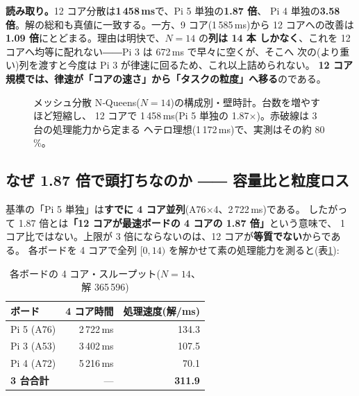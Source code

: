 \noindent
\textbf{読み取り。}12 コア分散は\textbf{1\,458\,ms}で、Pi 5 単独の\textbf{1.87 倍}、
Pi 4 単独の\textbf{3.58 倍}。解の総和も真値に一致する。一方、9 コア(1\,585\,ms)から
12 コアへの改善は\textbf{1.09 倍}にとどまる。理由は明快で、$N{=}14$ の\textbf{列は 14 本
しかなく}、これを 12 コアへ均等に配れない――Pi 3 は 672\,ms で早々に空くが、そこへ
次の(より重い)列を渡すと今度は Pi 3 が律速に回るため、これ以上詰められない。
\textbf{12 コア規模では、律速が「コアの速さ」から「タスクの粒度」へ移る}のである。

\begin{figure}[h]\centering
{}
\caption{メッシュ分散 N‑Queens($N{=}14$)の構成別・壁時計。台数を増やすほど短縮し、
12 コアで 1\,458\,ms(Pi 5 単独の 1.87$\times$)。赤破線は 3 台の処理能力から定まる
ヘテロ理想(1\,172\,ms)で、実測はその約 80\,\%。}\label{fig:scale}
\end{figure}

\subsection{なぜ 1.87 倍で頭打ちなのか ―― 容量比と粒度ロス}
基準の「Pi 5 単独」は\textbf{すでに 4 コア並列}(A76$\times$4、2\,722\,ms)である。
したがって 1.87 倍とは\textbf{「12 コアが最速ボードの 4 コアの 1.87 倍」}という意味で、
1 コア比ではない。上限が 3 倍にならないのは、12 コアが\textbf{等質でない}からである。
各ボードを 4 コアで全列 $[0,14)$ を解かせて素の処理能力を測ると(表\ref{tab:cap}):

\begin{table}[h]\centering
\caption{各ボードの 4 コア・スループット($N{=}14$、解 365\,596)}\label{tab:cap}
\begin{tabular}{lrr}
\toprule
ボード & 4 コア時間 & 処理速度(解/ms) \\
\midrule
Pi 5 (A76) & 2\,722\,ms & 134.3 \\
Pi 3 (A53) & 3\,402\,ms & 107.5 \\
Pi 4 (A72) & 5\,216\,ms &  70.1 \\
\midrule
\textbf{3 台合計} & --- & \textbf{311.9} \\
\bottomrule
\end{tabular}
\end{table}

